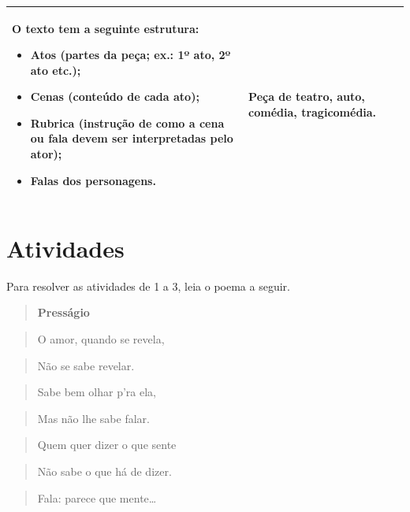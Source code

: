 \begin{longtable}[]{@{}lll@{}}
\begin{minipage}[t]{0.29\columnwidth}
O texto tem a seguinte estrutura:

\begin{itemize}
\item
  Atos (partes da peça; ex.: 1º  ato, 2º
  ato etc.);
\item
  Cenas (conteúdo de cada ato);
\item
  Rubrica (instrução de como a cena ou
  fala devem ser interpretadas
  pelo ator);
\item
  Falas dos personagens.
\end{itemize}\strut
\end{minipage} & \begin{minipage}[t]{0.29\columnwidth}\raggedright
Peça de teatro, auto, comédia, tragicomédia.\strut
\end{minipage}\tabularnewline
\bottomrule
\end{longtable}

\section{Atividades}

Para resolver as atividades de 1 a 3, leia o poema a seguir.


\begin{quote}
\textbf{Presságio}
\end{quote}


\begin{quote}
O amor, quando se revela,
\end{quote}

\begin{quote}
Não se sabe revelar.
\end{quote}

\begin{quote}
Sabe bem olhar p'ra ela,
\end{quote}

\begin{quote}
Mas não lhe sabe falar.
\end{quote}

\begin{quote}
Quem quer dizer o que sente
\end{quote}

\begin{quote}
Não sabe o que há de dizer.
\end{quote}

\begin{quote}
Fala: parece que mente\ldots{}
\end{quote}

